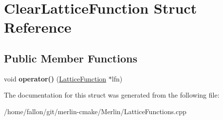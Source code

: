 \hypertarget{structClearLatticeFunction}{}\section{Clear\+Lattice\+Function Struct Reference}
\label{structClearLatticeFunction}
\subsection*{Public Member Functions}
\begin{DoxyCompactItemize}
\item 
\mbox{\label{structClearLatticeFunction_ae0601e470e3d9cbe56d8793e735f29c1}} 
void {\bfseries operator()} (\hyperlink{classLatticeFunction}{Lattice\+Function} $\ast$lfn)
\end{DoxyCompactItemize}


The documentation for this struct was generated from the following file\+:\begin{DoxyCompactItemize}
\item 
/home/fallon/git/merlin-\/cmake/\+Merlin/Lattice\+Functions.\+cpp\end{DoxyCompactItemize}
